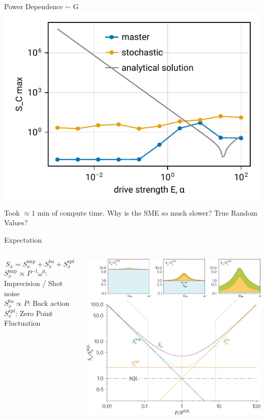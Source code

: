 \begin{frame}{Power Dependence $\sim$ G}
	\includegraphics{figures/02 power.pdf}
	\\\small
	Took $\approx1$ min of compute time. Why is the SME so much slower? True Random Values?
\end{frame}

\begin{frame}{Expectation}
	\begin{columns}
		$$S_x = S_x^\text{imp} + S_x^\text{ba} + S_x^\text{zpf}$$
		\small
		$S_x^\text{imp} \propto P^{-1} \omega^0$: Imprecision / Shot noise\\
		$S_x^\text{ba} \propto P$: Back action\\
		$S_x^\text{zpf}$: Zero Point Fluctuation

		\centering
		\includegraphics[width=\textwidth]{figures/Fig 1.png}
	\end{columns}
\end{frame}

